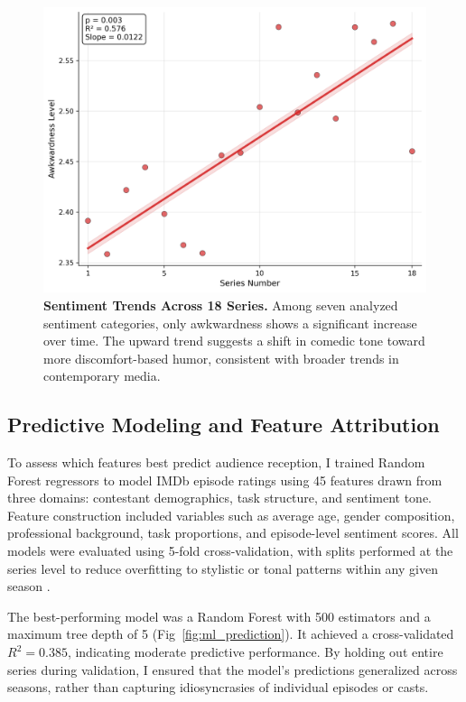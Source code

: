 \documentclass[10pt,letterpaper]{article}
\begin{document}
\begin{figure}[!h]
\centering
\includegraphics[width=\linewidth]{figures/main/Fig9.png}
\caption{{\bf Sentiment Trends Across 18 Series.}
Among seven analyzed sentiment categories, only awkwardness shows a significant increase over time. The upward trend suggests a shift in comedic tone toward more discomfort-based humor, consistent with broader trends in contemporary media.}
\label{fig:sentiment_trends}
\end{figure}
\FloatBarrier



\subsection*{Predictive Modeling and Feature Attribution}

To assess which features best predict audience reception, I trained Random Forest regressors to model IMDb episode ratings using 45 features drawn from three domains: contestant demographics, task structure, and sentiment tone. Feature construction included variables such as average age, gender composition, professional background, task proportions, and episode-level sentiment scores. All models were evaluated using 5-fold cross-validation, with splits performed at the series level to reduce overfitting to stylistic or tonal patterns within any given season \cite{Arlot2010}.

The best-performing model was a Random Forest with 500 estimators and a maximum tree depth of 5 \cite{Breiman2001} (Fig~\ref{fig:ml_prediction}). It achieved a cross-validated $R^2 = 0.385$, indicating moderate predictive performance. By holding out entire series during validation, I ensured that the model's predictions generalized across seasons, rather than capturing idiosyncrasies of individual episodes or casts.
\end{document}
